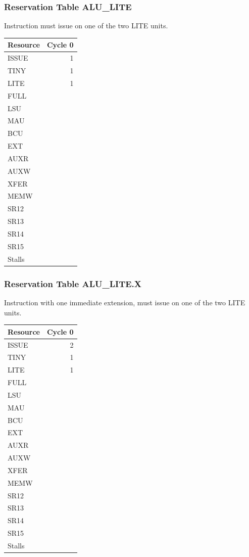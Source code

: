 \subsubsection{Reservation Table ALU\_LITE} \label{sec:reservation-ALU-LITE}

Instruction must issue on one of the two LITE units.
\medskip

\begin{tabular}{|l|r|} \hline
Resource	& Cycle 0 \\ \hline
\textsf{ISSUE}	& 1	\\
\textsf{TINY}	& 1	\\
\textsf{LITE}	& 1	\\
\textsf{FULL}	& 	\\
\textsf{LSU}	& 	\\
\textsf{MAU}	& 	\\
\textsf{BCU}	& 	\\
\textsf{EXT}	& 	\\
\textsf{AUXR}	& 	\\
\textsf{AUXW}	& 	\\
\textsf{XFER}	& 	\\
\textsf{MEMW}	& 	\\
\textsf{SR12}	& 	\\
\textsf{SR13}	& 	\\
\textsf{SR14}	& 	\\
\textsf{SR15}	& 	\\
\hline Stalls	& 	\\
\hline \end{tabular}

\subsubsection{Reservation Table ALU\_LITE.X} \label{sec:reservation-ALU-LITE.X}

Instruction with one immediate extension, must issue on one of the two LITE units.
\medskip

\begin{tabular}{|l|r|} \hline
Resource	& Cycle 0 \\ \hline
\textsf{ISSUE}	& 2	\\
\textsf{TINY}	& 1	\\
\textsf{LITE}	& 1	\\
\textsf{FULL}	& 	\\
\textsf{LSU}	& 	\\
\textsf{MAU}	& 	\\
\textsf{BCU}	& 	\\
\textsf{EXT}	& 	\\
\textsf{AUXR}	& 	\\
\textsf{AUXW}	& 	\\
\textsf{XFER}	& 	\\
\textsf{MEMW}	& 	\\
\textsf{SR12}	& 	\\
\textsf{SR13}	& 	\\
\textsf{SR14}	& 	\\
\textsf{SR15}	& 	\\
\hline Stalls	& 	\\
\hline \end{tabular}

